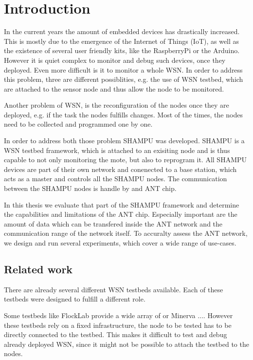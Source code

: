 \chapter{Introduction}
\label{sec:intro}
In the current years the amount of embedded devices has drastically increased. This is mostly due to the emergence of the Internet of Things (IoT), as well as the existence of several user friendly kits, like the RaspberryPi or the Arduino. However it is quiet complex to monitor and debug such devices, once they deployed. Even more difficult is it to monitor a whole WSN. In order to address this problem, three are different possiblities, e.g. the use of WSN testbed, which are attached to the sensor node and thus allow the node to be monitored.

Another problem of WSN, is the reconfiguration of the nodes once they are deployed, e.g. if the task the nodes fulfills changes. Most of the times, the nodes need to be collected and programmed one by one.

In order to address both those problem SHAMPU was developed. SHAMPU is a WSN testbed framework, which is attached to an exisiting node and is thus capable to not only monitoring the mote, but also to reprogram it. All SHAMPU devices are part of their own network and conenected to a base station, which acts as a master and controls all the SHAMPU nodes. The communication between the SHAMPU nodes is handle by and ANT chip.

In this thesis we evaluate that part of the SHAMPU framework and determine the capabilities and limitations of the ANT chip. Especially important are the amount of data which can be transfered inside the ANT network and the communication range of the network itself. To accuralty assess the ANT network, we design and run several experiments, which cover a wide range of use-cases.


\section{Related work}
\label{sec:related_work}

There are already several different WSN testbeds available. Each of these testbeds were designed to fulfill a different role. 

Some testbeds like FlockLab \cite{Lim2013} provide a wide array of  or Minerva \cite{Sommer} ....  However these testbeds rely on a fixed infrastructure, the node to be tested has to be directly connected to the testbed. This makes it difficult to test and debug already deployed WSN, since it might not be possible to attach the testbed to the nodes.

